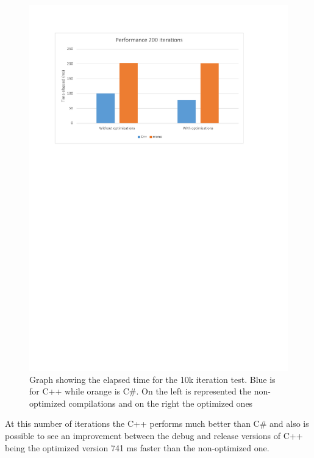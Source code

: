 \begin{figure}[H]\begin{center}
 \centering
  \captionsetup{justification=centering}
  \includegraphics[scale=0.9,page=2]{pictures/performance-tests/GPIO/graphs}
  \caption{Graph showing the elapsed time for the 10k iteration test. Blue is for C++ while orange is C\#. On the left is represented the non-optimized compilations and on the right the optimized ones\label{fig:gpio-graph-10k}}
\end{center}\end{figure}
At this number of iterations the C++ performs much better than C\# and also is possible to see an improvement between the debug and release versions of C++ being the optimized version 741 ms faster than the non-optimized one.

